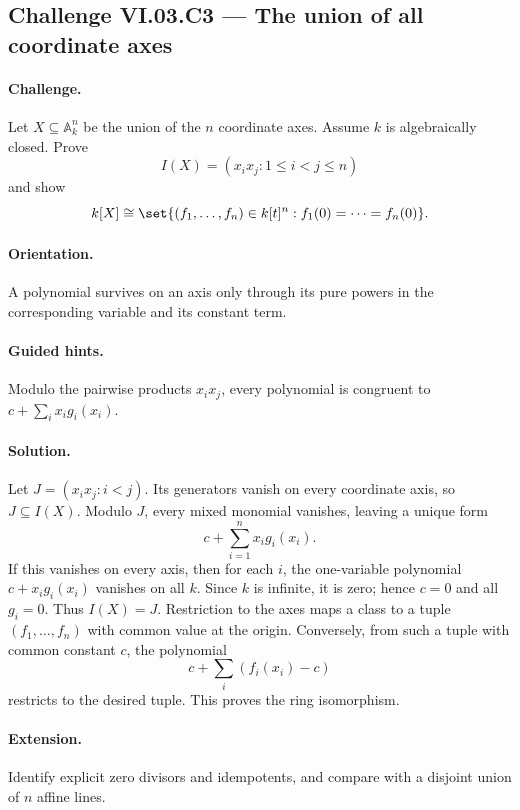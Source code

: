 \subsection*{Challenge VI.03.C3 --- The union of all coordinate axes}
\label{chall:vi03-c3}
\paragraph{Challenge.}
Let \(X\subseteq\mathbb A_k^n\) be the union of the \(n\) coordinate axes.  Assume \(k\) is
algebraically closed.  Prove
\[
I(X)=(x_ix_j:1\le i<j\le n)
\]
and show
\[
k[X]\cong
\set{(f_1,\dots,f_n)\in k[t]^n:f_1(0)=\cdots=f_n(0)}.
\]
\ifdefined\FullProblemDossiers
\paragraph{Orientation.} A polynomial survives on an axis only through its pure powers in the corresponding variable and its constant term.
\paragraph{Guided hints.} Modulo the pairwise products \(x_ix_j\), every polynomial is congruent to \(c+\sum_i x_i g_i(x_i)\).
\paragraph{Solution.}
Let \(J=(x_ix_j:i<j)\).  Its generators vanish on every coordinate axis, so \(J\subseteq I(X)\).
Modulo \(J\), every mixed monomial vanishes, leaving a unique form
\[
c+\sum_{i=1}^n x_i g_i(x_i).
\]
If this vanishes on every axis, then for each \(i\), the one-variable polynomial
\(c+x_i g_i(x_i)\) vanishes on all \(k\).  Since \(k\) is infinite, it is zero; hence
\(c=0\) and all \(g_i=0\).  Thus \(I(X)=J\).  Restriction to the axes maps a class to a
tuple \((f_1,\dots,f_n)\) with common value at the origin.  Conversely, from such a tuple
with common constant \(c\), the polynomial
\[
c+\sum_i(f_i(x_i)-c)
\]
restricts to the desired tuple.  This proves the ring isomorphism.
\paragraph{Extension.} Identify explicit zero divisors and idempotents, and compare with a disjoint union of \(n\) affine lines.
\fi

